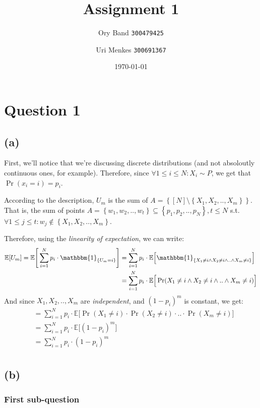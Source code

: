 \documentclass[a4paper]{article}
\title{Assignment 1}
\author{
    Ory Band \texttt{300479425} \and
    Uri Menkes \texttt{300691367}}
\date{\today}
\newcommand{\lc}{\left\{}
\newcommand{\rc}{\right\}}
\renewcommand{\notin}{\not\in}
\newcommand{\E}{\mathbb{E}}
\newcommand{\I}{\mathbbm{1}}
\newcommand{\Sum}{\sum\limits_{i=1}^N}
\newcommand{\qedsquare}{\tag*{$\square$}}
\begin{document}
\maketitle
\newpage

\section {Question 1}
\subsection {(a)}

First, we'll notice that we're discussing discrete distributions (and not absoloutly continuous ones, for example).
Therefore, since $ \forall 1 \leq i \leq N : X_i \sim P $, we get that $ \Pr(x_i=i)=p_i $.

According to the description, $ U_m $ is the sum of $ A = \lc [N] \setminus \lc X_1, X_2, .., X_m \rc \rc $.
That is, the sum of points $ A = \lc w_1, w_2, .., w_t \rc \subseteq \lc p_1, p_2, .., p_N \rc , t \leq N $
s.t. $ \forall 1 \leq j \leq t : w_j \notin \lc X_1, X_2, .., X_m \rc $.

Therefore, using the \textit{linearity of expectation}, we can write:
\begin{align*}
    \E[U_m] = \E \Bigg[ \Sum p_i \cdot \I_{ \lc U_m=i \rc } \Bigg]
    &= \Sum p_i \cdot \E \Big[ \I_{ \lc X_1 \neq i \wedge X_2 \neq i \wedge .. \wedge X_m\neq i \rc } \Big] \\
    &= \Sum p_i \cdot \E \Big[ \Pr(X_1 \neq i \wedge X_2 \neq i \wedge .. \wedge X_m\neq i) \Big]
\end{align*}
And since $ X_1, X_2, .., X_m $ are \textit{independent}, and $ (1-p_i)^m $ is constant, we get:
\begin{align*}
    &= \Sum p_i \cdot \E \Big[ \Pr(X_1 \neq i) \cdot \Pr(X_2 \neq i) \cdot .. \cdot \Pr(X_m \neq i) \Big] \\
    &= \Sum p_i \cdot \E \Big[ (1-p_i)^m \Big] \\
    &= \Sum p_i \cdot (1-p_i)^m \\
    \qedsquare
\end{align*}

\newpage

\subsection {(b)}

\subsubsection {First sub-question}
\end{document}
